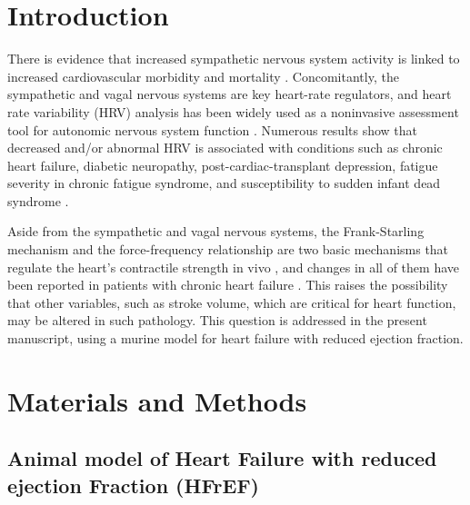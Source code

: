\documentclass[%
preprint,
 amsmath,amssymb,
 aps,
]{revtex4-2}
\begin{document}
\maketitle


\section{\label{sec:intro}Introduction}

There is evidence that increased sympathetic nervous system activity is linked to increased cardiovascular morbidity and mortality \citep{Malpas_2010}. Concomitantly, the sympathetic and vagal nervous systems are key heart-rate regulators, and heart rate variability (HRV) analysis has been widely used as a noninvasive assessment tool for autonomic nervous system function \citep{Kiyono_2016}. Numerous results show that decreased and/or abnormal HRV is associated with conditions such as chronic heart failure, diabetic neuropathy, post-cardiac-transplant depression, fatigue severity in chronic fatigue syndrome, and susceptibility to sudden infant dead syndrome \citep{Kamen_1995, Rajendra_Acharya_2006, Zeki_Al_Hazzouri_2014, Escorihuela_2020}. 

Aside from the sympathetic and vagal nervous systems, the Frank-Starling mechanism and the force-frequency relationship are two basic mechanisms that regulate the heart's contractile strength in vivo \citep{Holubarsch_1996}, and changes in all of them have been reported in patients with chronic heart failure \citep{Mulieri_1992, Pieske_1992, Bristow_1982, Bristow_1989, Holubarsch_1996}. This raises the possibility that other variables, such as stroke volume, which are critical for heart function, may be altered in such pathology. This question is addressed in the present manuscript, using a murine model for heart failure with reduced ejection fraction.

\section{\label{sec:meth}Materials and Methods}

\subsection{Animal model of  Heart Failure with reduced ejection Fraction  (HFrEF)}
\end{document}
